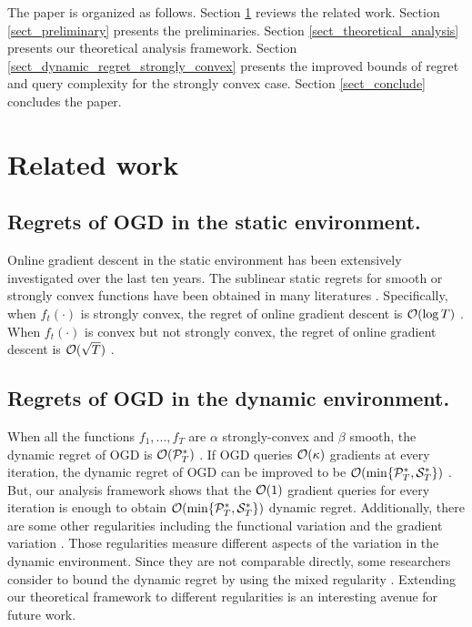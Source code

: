 \documentclass[journal]{IEEEtran}
\begin{document}
The paper is organized as follows. Section \ref{sect_related_work} reviews the related work. Section \ref{sect_preliminary} presents the preliminaries. Section \ref{sect_theoretical_analysis} presents our theoretical analysis framework. Section \ref{sect_dynamic_regret_strongly_convex} presents the improved bounds of regret and query complexity for the strongly convex case. Section \ref{sect_conclude} concludes the paper. 



\section{Related work}
\label{sect_related_work}

\subsection{Regrets of OGD in the static environment.}
Online gradient descent in the static environment has been extensively investigated over the last ten years. The sublinear static regrets for smooth or strongly convex functions have been obtained in many literatures \cite{ShalevShwartz:2012dz,Hazan2016Introduction,Duchi:2011,Zinkevich:2003}. Specifically, when $f_t(\cdot)$ is strongly convex, the regret of online gradient descent is ${\mathcal{O}}(\log T)$ \cite{Hazan2016Introduction}. When 
$f_t(\cdot)$ is convex but not strongly convex, the regret of online gradient descent is ${\mathcal{O}}(\sqrt{T})$ \cite{Hazan2016Introduction}.


\subsection{Regrets of OGD in the dynamic environment.}
When all the functions $f_1, ..., f_T$ are $\alpha $ strongly-convex and $\beta$ smooth, the dynamic regret of OGD is ${\mathcal{O}}({\mathcal{P}}_T^{\ast})$ \cite{Mokhtari:2016jz,Yang:2016ud}. If OGD queries ${\mathcal{O}}(\kappa)$ gradients at every iteration, the dynamic regret of OGD can be improved to be ${\mathcal{O}}(\min\{{\mathcal{P}}_T^{\ast}, {\mathcal{S}}_T^{\ast}\})$ \cite{Zhang:2016wl}. But, our analysis framework shows that the ${\mathcal{O}}(1)$ gradient queries for every iteration is enough to  obtain ${\mathcal{O}}(\min\{{\mathcal{P}}_T^{\ast}, {\mathcal{S}}_T^{\ast}\})$ dynamic regret.  Additionally,  there are some other regularities including the functional variation \cite{Zhu:2015tr,Besbes:2015gb} and  the gradient variation \cite{Chiang2012Online}. Those regularities measure different aspects of the variation in the dynamic environment. Since they are not comparable directly, some researchers consider to bound the dynamic regret by using the mixed regularity \cite{Jadbabaie:2015wg}. Extending our theoretical framework to different regularities is an interesting  avenue for future work.
\end{document}
